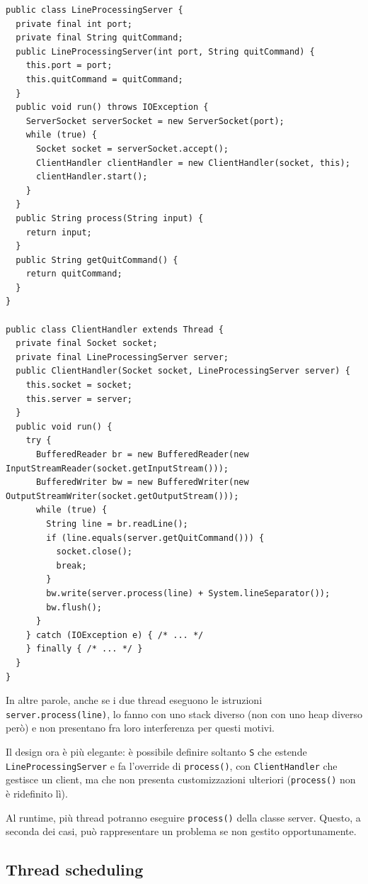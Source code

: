 \documentclass[\fontsizeclass,twocolumn]{\classname}
\theoremstyle{definition}
\theoremstyle{definition}
\begin{document}
\begin{lstlisting}
public class LineProcessingServer {
  private final int port;
  private final String quitCommand;
  public LineProcessingServer(int port, String quitCommand) {
    this.port = port;
    this.quitCommand = quitCommand;
  }
  public void run() throws IOException {
    ServerSocket serverSocket = new ServerSocket(port);
    while (true) {
      Socket socket = serverSocket.accept();
      ClientHandler clientHandler = new ClientHandler(socket, this);
      clientHandler.start();
    }
  }
  public String process(String input) {
    return input;
  }
  public String getQuitCommand() {
    return quitCommand;
  }
}

public class ClientHandler extends Thread {
  private final Socket socket;
  private final LineProcessingServer server;
  public ClientHandler(Socket socket, LineProcessingServer server) {
    this.socket = socket;
    this.server = server;
  }
  public void run() {
    try {
      BufferedReader br = new BufferedReader(new InputStreamReader(socket.getInputStream()));
      BufferedWriter bw = new BufferedWriter(new OutputStreamWriter(socket.getOutputStream()));
      while (true) {
        String line = br.readLine();
        if (line.equals(server.getQuitCommand())) {
          socket.close();
          break;
        }
        bw.write(server.process(line) + System.lineSeparator());
        bw.flush();
      }
    } catch (IOException e) { /* ... */
    } finally { /* ... */ }
  }
}
\end{lstlisting}

In altre parole, anche se i due thread eseguono le istruzioni
\texttt{server.process(line)}, lo fanno con uno stack diverso (non con uno heap
diverso però) e non presentano fra loro interferenza per questi motivi.

Il design ora è più elegante: è possibile definire soltanto \texttt{S} che
estende \texttt{LineProcessing\-Server} e fa l'override di \texttt{process()},
con \texttt{ClientHandler} che gestisce un client, ma che non presenta
customizzazioni ulteriori (\texttt{process()} non è ridefinito lì).

Al runtime, più thread potranno eseguire \texttt{process()} della classe
server. Questo, a seconda dei casi, può rappresentare un problema se non
gestito opportunamente.

\subsection{Thread scheduling}
\end{document}
